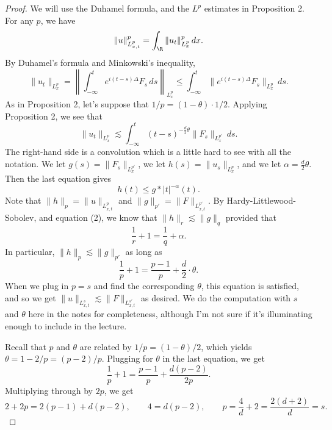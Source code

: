 \begin{proof}
We will use the Duhamel formula, and the $L^p$ estimates in Proposition 2. For any $p$, we have
\[\|u\|_{L^p_{x,t}}^p=\int_\R\|u_t\|_{L^p_x}^p\,dx.\]
By Duhamel's formula and Minkowski's inequality,
\[\|u_t\|_{L^p_x}=\left\|\int_{-\infty}^te^{i(t-s)\Delta}F_s\,ds\right\|_{L^p_x}\leq\int_{-\infty}^t\|e^{i(t-s)\Delta}F_s\|_{L^p_x}\,ds.\]
As in Proposition 2, let's suppose that $1/p=(1-\theta)\cdot1/2$. Applying Proposition 2, we see that
\[\|u_t\|_{L^p_x}\lesssim\int_{-\infty}^t(t-s)^{-\frac d2\theta}\|F_s\|_{L^{p'}_x}\,ds.\tag{1}\]
The right-hand side is a convolution which is a little hard to see with all the notation. We let $g(s)=\|F_s\|_{L^{p'}_x}$, we let $h(s)=\|u_s\|_{L^p_x}$, and we let $\alpha=\frac d2\theta$. Then the last equation gives
\[h(t)\leq g*|t|^{-\alpha}(t).\tag{2}\]
Note that $\|h\|_p=\|u\|_{L^p_{x,t}}$ and $\|g\|_{p'}=\|F\|_{L^{p'}_{x,t}}$. By Hardy-Littlewood-Sobolev, and equation (2), we know that $\|h\|_r\lesssim\|g\|_q$ provided that
\[\frac1r+1=\frac1q+\alpha.\]
In particular, $\|h\|_p\lesssim\|g\|_{p'}$ as long as
\[\frac1p+1=\frac{p-1}{p}+\frac d2\cdot\theta.\]
When we plug in $p=s$ and find the corresponding $\theta$, this equation is satisfied, and so we get $\|u\|_{L^s_{x,t}}\lesssim\|F\|_{L^{s'}_{x,t}}$ as desired. We do the computation with $s$ and $\theta$ here in the notes for completeness, although I'm not sure if it's illuminating enough to include in the lecture.

Recall that $p$ and $\theta$ are related by $1/p=(1-\theta)/2$, which yields $\theta=1-2/p=(p-2)/p$. Plugging for $\theta$ in the last equation, we get
\[\frac1p+1=\frac{p-1}{p}+\frac{d(p-2)}{2p}.\]
Multiplying through by $2p$, we get
\[2+2p=2(p-1)+d(p-2),\qquad4=d(p-2),\qquad p=\frac4d+2=\frac{2(d+2)}d=s.\]
\end{proof}
